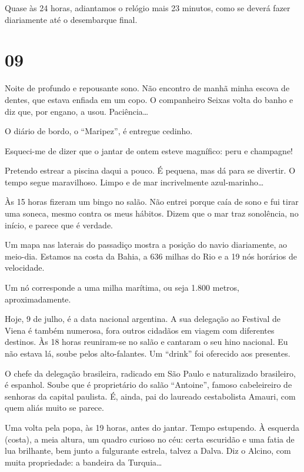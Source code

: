 Quase às 24 horas, adiantamos o relógio mais 23 minutos, como se deverá fazer diariamente até o desembarque final.

\section*{09 \adfflatleafright {}}

Noite de profundo e repousante sono. Não encontro de manhã minha escova de dentes, que estava enfiada em um copo. O companheiro Seixas volta do banho e diz que, por engano, a usou. Paciência\ldots

O diário de bordo, o ``Maripez'', é entregue cedinho.

Esqueci-me de dizer que o jantar de ontem esteve magnífico: peru e champagne!

Pretendo estrear a piscina daqui a pouco. É pequena, mas dá para se divertir. O tempo segue maravilhoso. Limpo e de mar incrivelmente azul-marinho\ldots

Às 15 horas fizeram um bingo no salão. Não entrei porque caía de sono e fui tirar uma soneca, mesmo contra os meus hábitos. Dizem que o mar traz sonolência, no início, e parece que é verdade.

Um mapa nas laterais do passadiço mostra a posição do navio diariamente, ao meio-dia. Estamos na costa da Bahia, a 636 milhas do Rio e a 19 nós horários de velocidade.

Um nó corresponde a uma milha marítima, ou seja 1.800 metros, aproximadamente.

Hoje, 9 de julho, é a data nacional argentina. A sua delegação ao Festival de Viena é também numerosa, fora outros cidadãos em viagem com diferentes destinos. Às 18 horas reuniram-se no salão e cantaram o seu hino nacional. Eu não estava lá, soube pelos alto-falantes. Um ``drink'' foi oferecido aos presentes.

O chefe da delegação brasileira, radicado em São Paulo e naturalizado brasileiro, é espanhol. Soube que é proprietário do salão ``Antoine'', famoso cabeleireiro de senhoras da capital paulista. É, ainda, pai do laureado cestabolista Amauri, com quem aliás muito se parece.

Uma volta pela popa, às 19 horas, antes do jantar. Tempo estupendo. À esquerda (costa), a meia altura, um quadro curioso no céu: certa escuridão e uma fatia de lua brilhante, bem junto a fulgurante estrela, talvez a Dalva. Diz o Alcino, com muita propriedade: a bandeira da Turquia\ldots


